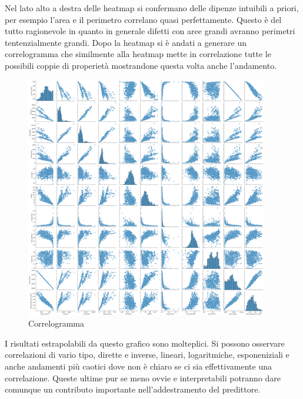 \documentclass[12pt,a4paper,openright,twoside]{report}
\begin{document}
\newpage
Nel lato alto a destra delle heatmap si confermano delle dipenze intuibili a priori, per esempio l'area e il perimetro correlano quasi perfettamente. Questo è del tutto ragionevole in quanto in generale difetti con aree grandi avranno perimetri tentenzialmente grandi. 
\newpage
Dopo la heatmap si è andati a generare un correlogramma che similmente alla heatmap mette in correlazione tutte le possibili coppie di properietà mostrandone questa volta anche l'andamento. 
\begin{center}
\begin{figure}[h]
\centering
\includegraphics[width=400px,keepaspectratio]{corr.png}
\caption{Correlogramma }
\end{figure}    
\end{center}
I risultati estrapolabili da questo grafico sono molteplici. Si possono osservare correlazioni di vario tipo, dirette e inverse, lineari, logaritmiche, esponeniziali e anche andamenti più caotici dove non è chiaro se ci sia effettivamente una correlazione. 
Queste ultime pur se meno ovvie e interpretabili potranno dare comunque un contributo importante nell'addestramento del predittore. 
\end{document}

